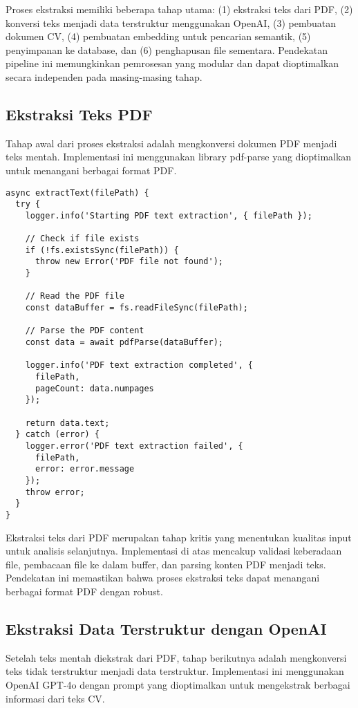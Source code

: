 Proses ekstraksi memiliki beberapa tahap utama: (1) ekstraksi teks dari PDF, (2) konversi teks menjadi data terstruktur menggunakan OpenAI, (3) pembuatan dokumen CV, (4) pembuatan embedding untuk pencarian semantik, (5) penyimpanan ke database, dan (6) penghapusan file sementara. Pendekatan pipeline ini memungkinkan pemrosesan yang modular dan dapat dioptimalkan secara independen pada masing-masing tahap.

\subsection{Ekstraksi Teks PDF}
Tahap awal dari proses ekstraksi adalah mengkonversi dokumen PDF menjadi teks mentah. Implementasi ini menggunakan library pdf-parse yang dioptimalkan untuk menangani berbagai format PDF.

\begin{verbatim}
async extractText(filePath) {
  try {
    logger.info('Starting PDF text extraction', { filePath });
    
    // Check if file exists
    if (!fs.existsSync(filePath)) {
      throw new Error('PDF file not found');
    }
    
    // Read the PDF file
    const dataBuffer = fs.readFileSync(filePath);
    
    // Parse the PDF content
    const data = await pdfParse(dataBuffer);
    
    logger.info('PDF text extraction completed', { 
      filePath, 
      pageCount: data.numpages 
    });
    
    return data.text;
  } catch (error) {
    logger.error('PDF text extraction failed', { 
      filePath, 
      error: error.message 
    });
    throw error;
  }
}
\end{verbatim}

Ekstraksi teks dari PDF merupakan tahap kritis yang menentukan kualitas input untuk analisis selanjutnya. Implementasi di atas mencakup validasi keberadaan file, pembacaan file ke dalam buffer, dan parsing konten PDF menjadi teks. Pendekatan ini memastikan bahwa proses ekstraksi teks dapat menangani berbagai format PDF dengan robust.

\subsection{Ekstraksi Data Terstruktur dengan OpenAI}
Setelah teks mentah diekstrak dari PDF, tahap berikutnya adalah mengkonversi teks tidak terstruktur menjadi data terstruktur. Implementasi ini menggunakan OpenAI GPT-4o dengan prompt yang dioptimalkan untuk mengekstrak berbagai informasi dari teks CV.

